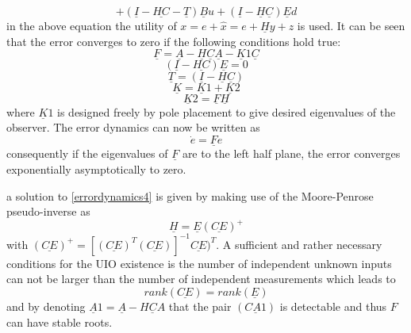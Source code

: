 \begin{equation*}
+ (\underline I - \underline {HC} - \underline T)\underline Bu	+(\underline I -\underline H\underline C)\underline E d
\label{errordynamics45}
\end{equation*}
in the above equation the utility of $x  = e + \hat{x} = e + \underline Hy+z$ is used. It can be seen that the error converges to zero if the following conditions hold true:
 \begin{equation}
 \underline F = \underline A-\underline H \underline C \underline A-\underline K1 \underline C
 \label{errordynamics3}
 \end{equation}
\begin{equation}
(\underline I - \underline{HC})\underline E = 0
\label{errordynamics4}
\end{equation}
\begin{equation}
\underline T = (\underline I - \underline H\underline C)
\label{errordynamics5}
\end{equation}
\begin{equation}
\underline K = \underline K1 +\underline K2
\label{errordynamics6}
\end{equation}
\begin{equation}
\underline K2 =\underline F \underline H 
\label{errordynamics7}
\end{equation}
where $\underline K1$ is designed freely by pole placement to give desired eigenvalues of the observer. The error dynamics can now be written as 
\begin{equation}
\dot{e} = \underline F e
\label{errordynamics8}
\end{equation}
consequently if the eigenvalues of $\underline F$ are to the left half plane, the error converges exponentially asymptotically to zero. 

a solution to \eqref{errordynamics4} is given by making use of the Moore-Penrose pseudo-inverse as
\begin{equation}
\underline H = \underline E (\underline{CE})^{+}
\label{errordynamics9}
\end{equation}
with $(\underline{CE})^{+} = [(\underline{CE})^{T} (\underline{CE})]^{-1}\underline{CE})^{T} $.
A sufficient and rather necessary conditions for the UIO existence is the number of independent unknown inputs can not be larger than the number of independent measurements which leads to
  \begin{equation}
  rank (\underline{CE}) =rank( \underline E) 
  \label{errordynamics10}
  \end{equation}
  and by denoting $\underline A1 = \underline A - \underline{HCA} $ that the pair $(\underline {CA1})$ is detectable and thus $F$ can have stable roots.
